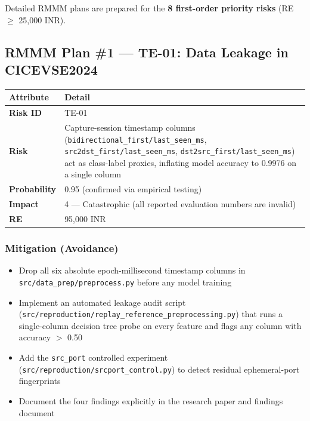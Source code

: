 \documentclass[11pt, a4paper]{article}
\newcommand{\col}[1]{\texttt{\small #1}}
\begin{document}
Detailed RMMM plans are prepared for the \textbf{8 first-order priority risks} (RE $\geq$ 25,000 INR).

\subsection{RMMM Plan \#1 --- TE-01: Data Leakage in CICEVSE2024}

\begin{center}
\small
\begin{tabular}{|l|p{10cm}|}
\hline
\rowcolor{red!10}
\textbf{Attribute} & \textbf{Detail} \\
\hline
\textbf{Risk ID} & TE-01 \\
\hline
\textbf{Risk} & Capture-session timestamp columns (\col{bidirectional\_first/last\_seen\_ms}, \col{src2dst\_first/last\_seen\_ms}, \col{dst2src\_first/last\_seen\_ms}) act as class-label proxies, inflating model accuracy to 0.9976 on a single column \\
\hline
\textbf{Probability} & 0.95 (confirmed via empirical testing) \\
\hline
\textbf{Impact} & 4 --- Catastrophic (all reported evaluation numbers are invalid) \\
\hline
\textbf{RE} & 95,000 INR \\
\hline
\end{tabular}
\normalsize
\end{center}

\subsubsection*{Mitigation (Avoidance)}
\begin{itemize}[leftmargin=*]
    \item Drop all six absolute epoch-millisecond timestamp columns in \col{src/data\_prep/preprocess.py} before any model training
    \item Implement an automated leakage audit script (\col{src/reproduction/replay\_reference\_preprocessing.py}) that runs a single-column decision tree probe on every feature and flags any column with accuracy $>$ 0.50
    \item Add the \col{src\_port} controlled experiment (\col{src/reproduction/srcport\_control.py}) to detect residual ephemeral-port fingerprints
    \item Document the four findings explicitly in the research paper and findings document
\end{itemize}
\end{document}
